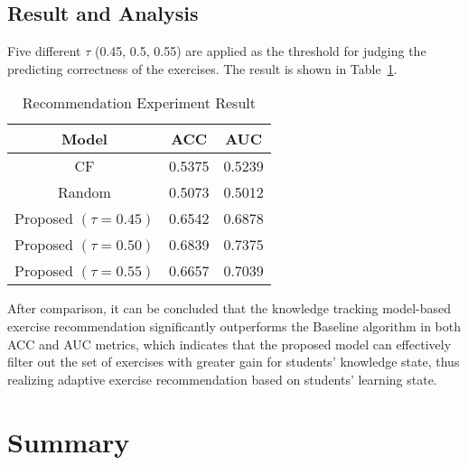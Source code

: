 \subsection{Result and Analysis}
Five different \(\tau \) (0.45, 0.5, 0.55) are applied as the threshold for judging the predicting correctness of the exercises. The result is shown in Table~\ref{table:ch4-exp-result}.
\begin{table}[htbp!]
  \caption{Recommendation Experiment Result}\label{table:ch4-exp-result}
  \centering
  \begin{tabular}{c c c}
    \toprule
    Model                    & ACC    & AUC    \\
    \midrule
    CF                       & 0.5375 & 0.5239 \\
    Random                   & 0.5073 & 0.5012 \\
    \midrule
    Proposed \((\tau=0.45)\) & 0.6542 & 0.6878 \\
    Proposed \((\tau=0.50)\) & 0.6839 & 0.7375 \\
    Proposed \((\tau=0.55)\) & 0.6657 & 0.7039 \\
    \bottomrule
  \end{tabular}
\end{table}
After comparison, it can be concluded that the knowledge tracking model-based exercise recommendation significantly outperforms the Baseline algorithm in both ACC and AUC metrics, which indicates that the proposed model can effectively filter out the set of exercises with greater gain for students' knowledge state, thus realizing adaptive exercise recommendation based on students' learning state.

\section{Summary}

